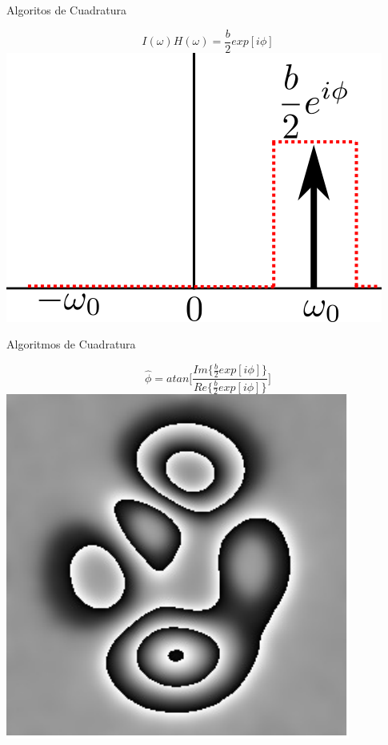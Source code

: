 \documentclass[]{beamer}
\begin{document}
\begin{frame}{Algoritos de Cuadratura}
\begin{center}

    \begin{equation}
             I(\omega) H(\omega) = \frac{b}{2}exp[i \phi]
     \end{equation}
     \includegraphics[scale=0.6]{Images/FourierDomine3.png}

  \end{center}
\end{frame}
\begin{frame}{Algoritmos de Cuadratura}
\begin{center}

  \begin{equation}
    \hat \phi=atan\bigg[ \frac{ Im\{\frac{b}{2}exp[i \phi]\} }{
      Re\{\frac{b}{2}exp[i \phi]\} } \bigg]
  \end{equation}
  \includegraphics[scale=0.6]{Images/wPhase.pdf}

\end{center}
\end{frame}
\end{document}
